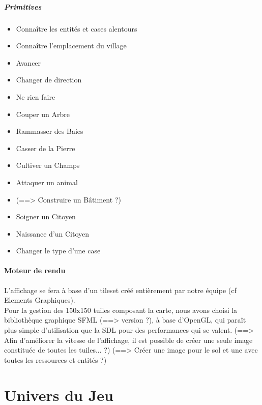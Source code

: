 \documentclass[a4paper]{article}
\begin{document}
        \subsubsection{Primitives}
          \begin{itemize} \small
            \item Connaître les entités et cases alentours
            \item Connaître l'emplacement du village
            \item Avancer
            \item Changer de direction
            \item Ne rien faire
            \item Couper un Arbre
            \item Rammasser des Baies
            \item Casser de la Pierre
            \item Cultiver un Champs
            \item Attaquer un animal
            \item (==> Construire un Bâtiment ?)
            \item Soigner un Citoyen
            \item Naissance d'un Citoyen
            \item Changer le type d'une case
          \end{itemize} \normalsize


        \subsection{Moteur de rendu}
          L'affichage se fera à base d'un tileset créé entièrement par notre équipe (cf Elements Graphiques).\\
          Pour la gestion des 150x150 tuiles composant la carte, nous avons choisi la bibliothèque graphique SFML (==> version ?), à base d'OpenGL, qui paraît plus simple d'utilisation que la SDL pour des performances qui se valent.
          (==> Afin d'améliorer la vitesse de l'affichage, il est possible de créer une seule image constituée de toutes les tuiles... ?)
          (==> Créer une image pour le sol et une avec toutes les ressources et entités ?)


  \newpage
  \part{Univers du Jeu}
\end{document}
